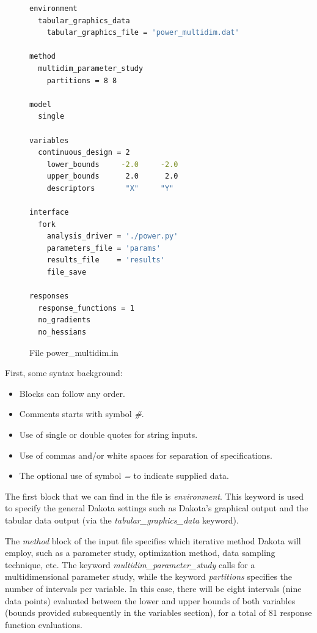 \documentclass[12pt,a4paper,article]{memoir}
\begin{document}
\begin{figure}[htb!]
\begin{lstlisting}[style=MyCodeStyle,language=bash]
environment
  tabular_graphics_data
    tabular_graphics_file = 'power_multidim.dat'

method
  multidim_parameter_study
    partitions = 8 8

model
  single

variables
  continuous_design = 2
    lower_bounds     -2.0     -2.0
    upper_bounds      2.0      2.0
    descriptors       "X"     "Y"

interface
  fork
    analysis_driver = './power.py'
    parameters_file = 'params'
    results_file    = 'results'
    file_save

responses
  response_functions = 1
  no_gradients
  no_hessians
\end{lstlisting}
\caption{File power\_multidim.in}
\label{fig:PoMuCode}
\end{figure}

First, some syntax background:
\begin{itemize}
\item Blocks can follow any order.
\item Comments starts with symbol \textit{\#}.
\item Use of single or double quotes for string inputs.
\item Use of commas and/or white spaces for separation of specifications.
\item The optional use of symbol \textit{=} to indicate supplied data.
\end{itemize}

The first block that we can find in the file is \textit{environment}. This keyword is used to specify the general Dakota settings such as Dakota's graphical output and the tabular data output (via the \textit{tabular\_graphics\_data} keyword).

The \textit{method} block of the input file specifies which iterative method Dakota will employ, such as a parameter study, optimization method, data sampling technique, etc. The keyword \textit{multidim\_parameter\_study} calls for a multidimensional parameter study, while the keyword \textit{partitions} specifies the number of intervals per variable. In this case, there will be eight intervals (nine data points) evaluated between the lower and upper bounds of both variables (bounds provided subsequently in the variables section), for a total of 81 response function evaluations.
\end{document}
